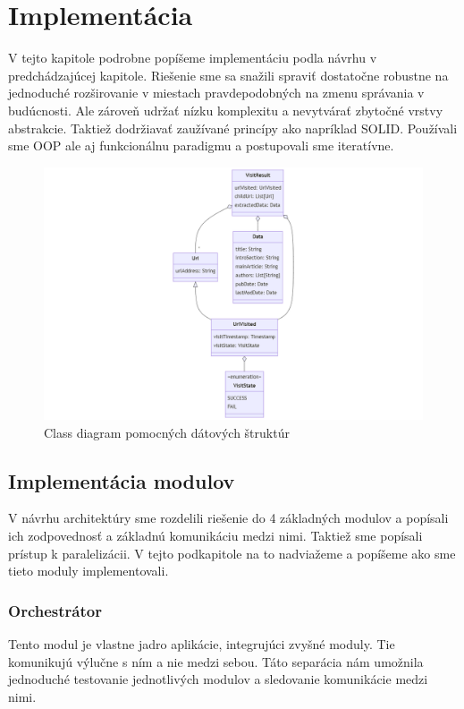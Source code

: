 \chapter{Implementácia}
\label{implementation}
V tejto kapitole podrobne popíšeme implementáciu podla návrhu v predchádzajúcej kapitole. Riešenie sme sa snažili spraviť dostatočne robustne na jednoduché rozširovanie v miestach pravdepodobných na zmenu správania v budúcnosti. Ale zároveň udržať nízku komplexitu a nevytvárať zbytočné vrstvy abstrakcie. Taktiež dodržiavať zaužívané princípy ako napríklad SOLID. 
Používali sme OOP ale aj funkcionálnu paradigmu a postupovali sme iteratívne. 

\begin{figure}[!ht]
    \centering
    \includegraphics[width=.9\textwidth]{figures/classDiagramVisitResult.png}
    \caption{Class diagram pomocných dátových štruktúr \label{o:classDiagramVisitResult}}
\end{figure}

\section{Implementácia modulov}
V návrhu architektúry sme rozdelili riešenie do 4 základných modulov a popísali ich zodpovednosť a základnú komunikáciu medzi nimi. Taktiež sme popísali prístup k paralelizácii. V tejto podkapitole na to nadviažeme a popíšeme ako sme tieto moduly implementovali. 

\subsection{Orchestrátor}
Tento modul je vlastne jadro aplikácie, integrujúci zvyšné moduly. Tie komunikujú výlučne s ním a nie medzi sebou. Táto separácia nám umožnila jednoduché testovanie jednotlivých modulov a sledovanie komunikácie medzi nimi.

